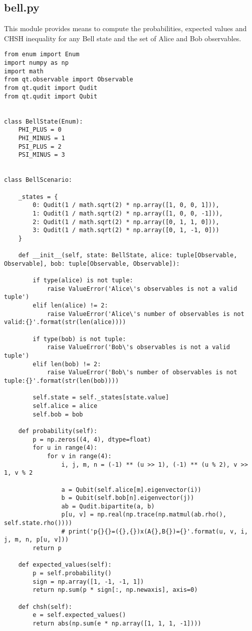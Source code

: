 \subsection{bell.py}\label{section:listings_bell}
This module provides means to compute the probabilities, expected values and CHSH inequality for any Bell state and the set of Alice and Bob observables. 
\begin{verbatim}
from enum import Enum
import numpy as np
import math
from qt.observable import Observable
from qt.qudit import Qudit
from qt.qudit import Qubit


class BellState(Enum):
    PHI_PLUS = 0
    PHI_MINUS = 1
    PSI_PLUS = 2
    PSI_MINUS = 3


class BellScenario:

    _states = {
        0: Qudit(1 / math.sqrt(2) * np.array([1, 0, 0, 1])),
        1: Qudit(1 / math.sqrt(2) * np.array([1, 0, 0, -1])),
        2: Qudit(1 / math.sqrt(2) * np.array([0, 1, 1, 0])),
        3: Qudit(1 / math.sqrt(2) * np.array([0, 1, -1, 0]))
    }

    def __init__(self, state: BellState, alice: tuple[Observable, Observable], bob: tuple[Observable, Observable]):

        if type(alice) is not tuple:
            raise ValueError('Alice\'s observables is not a valid tuple')
        elif len(alice) != 2:
            raise ValueError('Alice\'s number of observables is not valid:{}'.format(str(len(alice))))

        if type(bob) is not tuple:
            raise ValueError('Bob\'s observables is not a valid tuple')
        elif len(bob) != 2:
            raise ValueError('Bob\'s number of observables is not tuple:{}'.format(str(len(bob))))

        self.state = self._states[state.value]
        self.alice = alice
        self.bob = bob

    def probability(self):
        p = np.zeros((4, 4), dtype=float)
        for u in range(4):
            for v in range(4):
                i, j, m, n = (-1) ** (u >> 1), (-1) ** (u % 2), v >> 1, v % 2

                a = Qubit(self.alice[m].eigenvector(i))
                b = Qubit(self.bob[n].eigenvector(j))
                ab = Qudit.bipartite(a, b)
                p[u, v] = np.real(np.trace(np.matmul(ab.rho(), self.state.rho())))
                # print('p{}{}=({},{})x(A{},B{})={}'.format(u, v, i, j, m, n, p[u, v]))
        return p

    def expected_values(self):
        p = self.probability()
        sign = np.array([1, -1, -1, 1])
        return np.sum(p * sign[:, np.newaxis], axis=0)

    def chsh(self):
        e = self.expected_values()
        return abs(np.sum(e * np.array([1, 1, 1, -1])))
\end{verbatim}
\newpage
